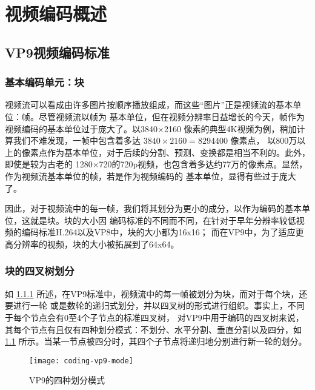 \chapter{视频编码概述}
\label{cha:coding}

\section{VP9视频编码标准}
\label{sec:vp9}


\subsection{基本编码单元：块}
\label{sec:block}

视频流可以看成由许多图片按顺序播放组成，而这些“图片”正是视频流的基本单位：帧。尽管视频流以帧为
基本单位，但在视频分辨率日益增长的今天，帧作为视频编码的基本单位过于庞大了。以3840×2160
像素的典型4K视频为例，稍加计算我们不难发现，一帧中包含着多达 $3840×2160 = 8294400$ 像素点，
以800万以上的像素点作为基本单位，对于后续的分割、预测、变换都是相当不利的。此外，即使是较为古老的
1280×720的720p视频，也包含着多达约77万的像素点。显然，作为视频流基本单位的帧，若是作为视频编码的
基本单位，显得有些过于庞大了。

因此，对于视频流中的每一帧，我们将其划分为更小的成分，以作为编码的基本单位，这就是块。块的大小因
编码标准的不同而不同，在针对于早年分辨率较低视频的编码标准H.264以及VP8中，块的大小都为16x16；
而在VP9中，为了适应更高分辨率的视频，块的大小被拓展到了64x64。



\subsection{块的四叉树划分}

如 \ref{sec:block} 所述，在VP9标准中，视频流中的每一帧被划分为块，而对于每个块，还要进行一轮
或是数轮的递归式划分，并以四叉树的形式进行组织。事实上，不同于每个节点会有0至4个子节点的标准四叉树，
对VP9中用于编码的四叉树来说，其每个节点有且仅有四种划分模式：不划分、水平分割、垂直分割以及四分，如
\ref{fig:coding-vp9-mode} 所示。当某一节点被四分时，其四个子节点将递归地分别进行新一轮的划分。

\begin{figure}[H] %
  \centering
  \texttt{[image: coding-vp9-mode]}
  \caption{VP9的四种划分模式}
  \label{fig:coding-vp9-mode}
\end{figure}

